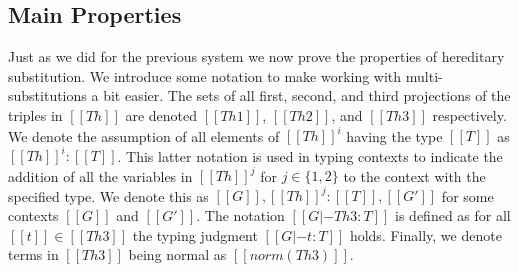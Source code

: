 \subsection{Main Properties}
\label{subsec:properties_of_the_hereditary_substitution_function}
Just as we did for the previous system we now prove the properties of
hereditary substitution.  We introduce some notation to make working
with multi-substitutions a bit easier.  The sets of all first, second,
and third projections of the triples in $[[Th]]$ are denoted $[[Th
1]]$, $[[Th 2]]$, and $[[Th 3]]$ respectively.  We denote the
assumption of all elements of $[[Th]]^i$ having the type $[[T]]$ as
$[[Th]]^i : [[T]]$. This latter notation is used in typing contexts to
indicate the addition of all the variables in $[[Th]]^j$ for $j \in
\{1,2\}$ to the context with the specified type.  We denote this as
$[[G]],[[Th]]^j : [[T]],[[G']]$ for some contexts $[[G]]$ and
$[[G']]$.  The notation $[[G |- Th 3 : T]]$ is defined as for all
$[[t]] \in [[Th 3]]$ the typing judgment $[[G |- t : T]]$ holds.
Finally, we denote terms in $[[Th 3]]$ being normal as $[[norm(Th
3)]]$.

